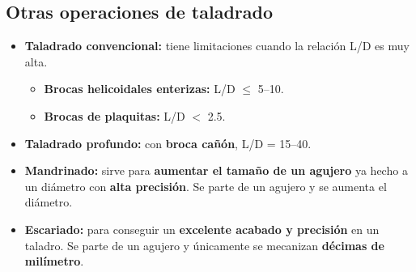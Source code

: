 \documentclass[12pt,a4paper]{article}
\begin{document}
\subsection{Otras operaciones de taladrado}
\begin{itemize}
	\item \textbf{Taladrado convencional:} tiene limitaciones cuando la relación
	      L/D es muy alta.
	      \begin{itemize}
		      \item \textbf{Brocas helicoidales enterizas:} L/D $\le$ 5--10.
		      \item \textbf{Brocas de plaquitas:} L/D $<$ 2.5.
	      \end{itemize}
	\item \textbf{Taladrado profundo:} con \textbf{broca cañón}, L/D = 15--40.
	\item \textbf{Mandrinado:} sirve para \textbf{aumentar el tamaño de un
		      agujero} ya hecho a un diámetro con \textbf{alta precisión}. Se parte
	      de un
	      agujero y se aumenta el diámetro.
	\item \textbf{Escariado:} para conseguir un \textbf{excelente acabado y
		      precisión} en un taladro. Se parte de un agujero y únicamente se
	      mecanizan
	      \textbf{décimas de milímetro}.
\end{itemize}
\end{document}
